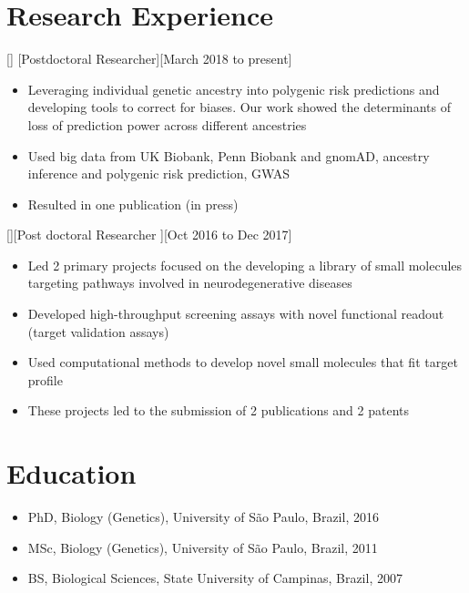 \documentclass{article}
\begin{document}
\section{Research Experience}

[]
[Postdoctoral Researcher][March 2018 to present]

\begin{itemize}
\item Leveraging individual genetic ancestry into polygenic risk predictions and developing tools to correct for biases. Our work showed the determinants of loss of prediction power
across different ancestries
\item Used big data from UK Biobank, Penn Biobank and gnomAD, ancestry inference and polygenic risk prediction, GWAS
\item Resulted in one publication (in press)
\end{itemize}

[][Post doctoral Researcher ][Oct 2016 to Dec 2017]

\begin{itemize}
\item Led 2 primary projects focused on the developing a library of small molecules targeting pathways involved in neurodegenerative diseases
\item Developed high-throughput screening assays with novel functional readout (target validation assays)
\item Used computational methods to develop novel small molecules that fit target profile
\item These projects led to the submission of 2 publications and 2 patents
\end{itemize}

 
\section{Education}

\begin{itemize}
\item PhD, Biology (Genetics), University of São Paulo, Brazil, 2016
\item MSc, Biology (Genetics), University of São Paulo, Brazil, 2011
\item BS, Biological Sciences, State University of Campinas, Brazil, 2007
\end{itemize}
 
\end{document}
